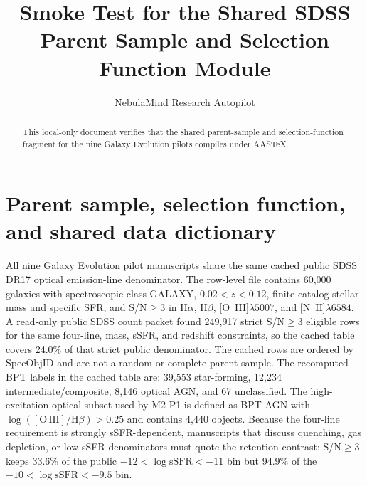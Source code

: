 \documentclass[twocolumn]{aastex631}
\begin{document}
\title{Smoke Test for the Shared SDSS Parent Sample and Selection Function Module}
\author{NebulaMind Research Autopilot}
\begin{abstract}
This local-only document verifies that the shared parent-sample and selection-function fragment for the nine Galaxy Evolution pilots compiles under AASTeX.
\end{abstract}
\section{Parent sample, selection function, and shared data dictionary}\label{sec:shared-selection}
All nine Galaxy Evolution pilot manuscripts share the same cached public SDSS DR17 optical emission-line denominator. The row-level file contains 60,000 galaxies with spectroscopic class GALAXY, $0.02<z<0.12$, finite catalog stellar mass and specific SFR, and S/N$\geq3$ in H$\alpha$, H$\beta$, [O~III]$\lambda5007$, and [N~II]$\lambda6584$. A read-only public SDSS count packet found 249,917 strict S/N$\geq3$ eligible rows for the same four-line, mass, sSFR, and redshift constraints, so the cached table covers 24.0\% of that strict public denominator. The cached rows are ordered by SpecObjID and are not a random or complete parent sample.
The recomputed BPT labels in the cached table are: 39,553 star-forming, 12,234 intermediate/composite, 8,146 optical AGN, and 67 unclassified. The high-excitation optical subset used by M2 P1 is defined as BPT AGN with $\log([\mathrm{O\,III}]/\mathrm{H}\beta)>0.25$ and contains 4,440 objects.
Because the four-line requirement is strongly sSFR-dependent, manuscripts that discuss quenching, gas depletion, or low-sSFR denominators must quote the retention contrast: S/N$\geq3$ keeps 33.6\% of the public $-12<\log\mathrm{sSFR}<-11$ bin but 94.9\% of the $-10<\log\mathrm{sSFR}<-9.5$ bin.
\end{document}
